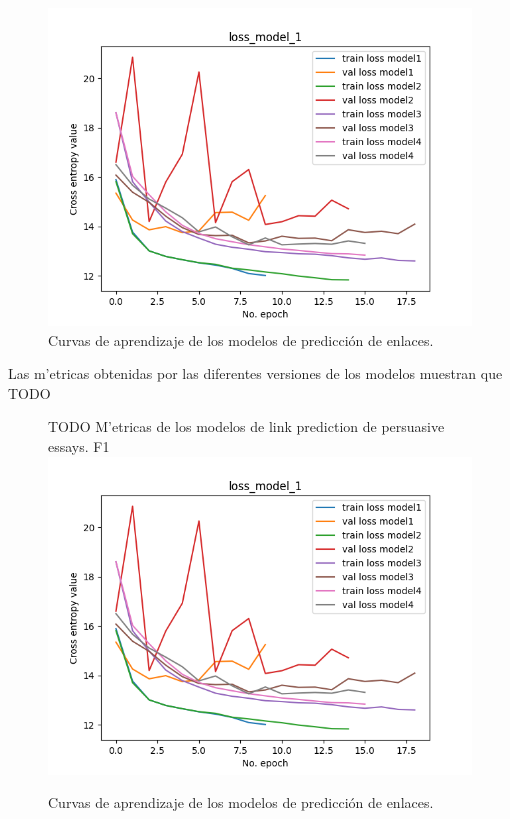 \begin{figure}[h!]
	\begin{center}
		\includegraphics[scale=.9]{Graphics/persuassive_essays_all_linked_link_prediction_loss_model_1.png}
	    \caption{Curvas de aprendizaje de los modelos de predicción de enlaces.}\label{fig:link_prediction_model_loss}
	\end{center}
\end{figure}

Las m'etricas obtenidas por las diferentes versiones de los modelos muestran que TODO

\begin{figure}[h!]
	\begin{center}
		TODO M'etricas de los modelos de link prediction de persuasive essays. F1
		\includegraphics[scale=.9]{Graphics/persuassive_essays_all_linked_link_prediction_loss_model_1.png}
	    \caption{Curvas de aprendizaje de los modelos de predicción de enlaces.}\label{fig:link_prediction_model_loss}
	\end{center}
\end{figure}

